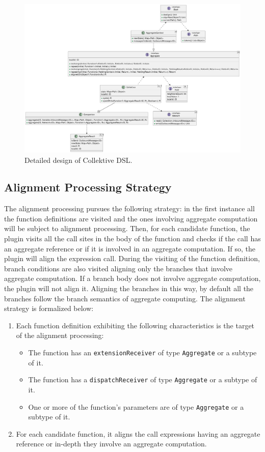 \begin{figure}
    \centering
    \includegraphics[width=\linewidth]{figures/collektive-design.pdf}
    \caption{Detailed design of Collektive DSL.}
    \label{fig:collektive-design}
\end{figure}

\subsection{Alignment Processing Strategy}

The alignment processing pursues the following strategy: in the first instance all the function definitions are visited and the ones involving aggregate computation will be subject to alignment processing. Then, for each candidate function, the plugin visits all the call sites in the body of the function and checks if the call has an aggregate reference or if it is involved in an aggregate computation. If so, the plugin will align the expression call. During the visiting of the function definition, branch conditions are also visited aligning only the branches that involve aggregate computation. If a branch body does not involve aggregate computation, the plugin will not align it. Aligning the branches in this way, by default all the branches follow the branch semantics of aggregate computing. The alignment strategy is formalized below:

\begin{enumerate}
    \item Each function definition exhibiting the following characteristics is the target of the alignment processing:
    \begin{itemize}
        \item The function has an \texttt{extensionReceiver} of type \texttt{Aggregate} or a subtype of it.
        \item The function has a \texttt{dispatchReceiver} of type \texttt{Aggregate} or a subtype of it.
        \item One or more of the function's parameters are of type \texttt{Aggregate} or a subtype of it.
    \end{itemize}
    \item For each candidate function, it aligns the call expressions having an aggregate reference or in-depth they involve an aggregate computation.
\end{enumerate}

